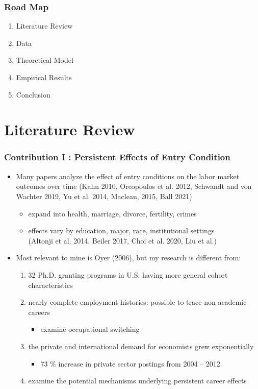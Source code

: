 \documentclass[10pt,svgnames,fragile]{beamer}
\begin{document}
\begin{frame}
	\frametitle{Road Map}
	\begin{enumerate}
		\item Literature Review
\vfill
		\item Data
\vfill
		\item Theoretical Model
\vfill
		\item Empirical Results
\vfill
		\item Conclusion
\vfill
	\end{enumerate}
\end{frame}


\section{Literature Review}
\begin{frame}
	\frametitle{Contribution I : Persistent Effects of Entry Condition} 
	\begin{itemize}
		\item Many papers analyze the effect of entry conditions on the labor market outcomes over time (Kahn 2010, Oreopoulos et al. 2012, Schwandt and von Wachter 2019, Yu et al. 2014,  Maclean, 2015, Ball 2021)
		\begin{itemize}
\vfill
			\item expand into health, marriage, divorce, fertility, crimes
			\vspace{2 mm}
			\item effects vary by education, major, race, institutional settings \\(Altonji et al. 2014, Beiler 2017, Choi et al. 2020, Liu et al.)
		\end{itemize}
\vfill
		\item Most relevant to mine is Oyer (2006), but my research is different from:
		\vfill
		\begin{enumerate}
			\item 32 Ph.D. granting programs in U.S. having more general cohort characteristics
			\vspace{2 mm}
			\item nearly complete employment histories: possible to trace non-academic careers
			\begin{itemize}
				\item examine occupational switching
			\end{itemize}
		\vspace{2 mm}
			\item the private and international demand for economists grew exponentially 
			\begin{itemize}
				\item 73 \% increase in private sector postings from 2004 -- 2012
			\end{itemize}
		\vspace{2 mm}
			\item examine the potential mechanisms underlying persistent career effects
		\end{enumerate}
\vfill
	\end{itemize}
\end{frame}
\end{document}
